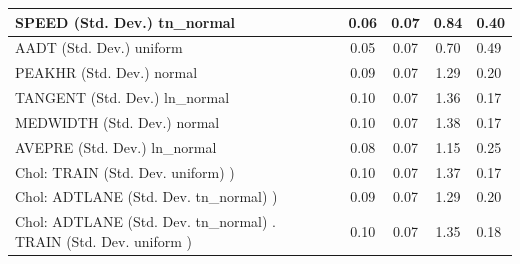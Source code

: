\begin{table}
\begin{center}
\begin{tabular}{|l|l|c|c|c|l|}
			\hline
			SPEED (Std. Dev.) tn_normal &  & 0.06 & 0.07 & 0.84 & 0.40 \\
			\hline
			AADT (Std. Dev.) uniform &  & 0.05 & 0.07 & 0.70 & 0.49 \\
			\hline
			PEAKHR (Std. Dev.) normal &  & 0.09 & 0.07 & 1.29 & 0.20 \\
			\hline
			TANGENT (Std. Dev.) ln_normal &  & 0.10 & 0.07 & 1.36 & 0.17 \\
			\hline
			MEDWIDTH (Std. Dev.) normal &  & 0.10 & 0.07 & 1.38 & 0.17 \\
			\hline
			AVEPRE (Std. Dev.) ln_normal &  & 0.08 & 0.07 & 1.15 & 0.25 \\
			\hline
			 Chol: TRAIN (Std. Dev. uniform) ) &  & 0.10 & 0.07 & 1.37 & 0.17 \\
			\hline
			 Chol: ADTLANE (Std. Dev. tn_normal) ) &  & 0.09 & 0.07 & 1.29 & 0.20 \\
			\hline
			 Chol: ADTLANE (Std. Dev. tn_normal) . TRAIN (Std. Dev.   uniform ) &  & 0.10 & 0.07 & 1.35 & 0.18 \\
			\hline
		\end{tabular}
	\end{center}
\end{table}